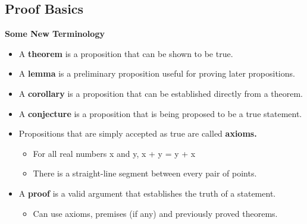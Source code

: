 \documentclass[12pt, letterpaper]{article}
\begin{document}
\subsection{Proof Basics}
\bigbreak
\textbf{Some New Terminology}
\begin{itemize}[leftmargin=0.5cm, label={\faAngleRight}]
	\item A \textbf{theorem} is a proposition that can be shown to be true.
	\item A \textbf{lemma} is a preliminary proposition useful for proving later propositions.
	\item A \textbf{corollary} is a proposition that can be established directly from a theorem.
	\item A \textbf{conjecture} is a proposition that is being proposed to be a true statement.
	\item Propositions that are simply accepted as true are called \textbf{axioms.}
	\begin{itemize}[label={\tiny ex:}]
		\item For all real numbers x and y, x + y = y + x 
		\item There is a straight-line segment between every pair of points.
	\end{itemize}
	\item A \textbf{proof} is a valid argument that establishes the truth of a statement.
	\begin{itemize}[leftmargin=*, label={}]
		\item \vspace*{-0.5cm} {\tiny Can use axioms, premises (if any) and previously proved theorems.}
	\end{itemize}
\end{itemize}
\end{document}
